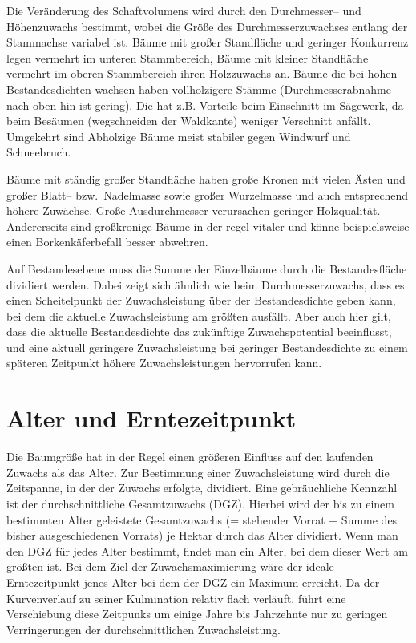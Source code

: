 \documentclass[twocolumn]{scrartcl}
\begin{document}
Die Veränderung des Schaftvolumens wird durch den Durchmesser-- und Höhenzuwachs
bestimmt, wobei die Größe des Durchmesserzuwachses entlang der Stammachse
variabel ist. Bäume mit großer Standfläche und geringer Konkurrenz legen
vermehrt im unteren Stammbereich, Bäume mit kleiner Standfläche vermehrt im
oberen Stammbereich ihren Holzzuwachs an. Bäume die bei hohen Bestandesdichten
wachsen haben vollholzigere Stämme (Durchmesserabnahme nach oben hin ist
gering). Die hat z.B. Vorteile beim Einschnitt im Sägewerk, da beim Besäumen
(wegschneiden der Waldkante) weniger Verschnitt anfällt. Umgekehrt sind
Abholzige Bäume meist stabiler gegen Windwurf und Schneebruch.

Bäume mit ständig großer Standfläche haben große Kronen mit vielen Ästen und
großer Blatt-- bzw.\ Nadelmasse sowie großer Wurzelmasse und auch entsprechend
höhere Zuwächse. Große Ausdurchmesser verursachen geringer Holzqualität.
Andererseits sind großkronige Bäume in der regel vitaler und könne
beispielsweise einen Borkenkäferbefall besser abwehren.

Auf Bestandesebene muss die Summe der Einzelbäume durch die Bestandesfläche
dividiert werden. Dabei zeigt sich ähnlich wie beim Durchmesserzuwachs, dass es
einen Scheitelpunkt der Zuwachsleistung über der Bestandesdichte geben kann, bei
dem die aktuelle Zuwachsleistung am größten ausfällt. Aber auch hier gilt, dass
die aktuelle Bestandesdichte das zukünftige Zuwachspotential beeinflusst, und
eine aktuell geringere Zuwachsleistung bei geringer Bestandesdichte zu einem
späteren Zeitpunkt höhere Zuwachsleistungen hervorrufen kann.

\section{Alter und Erntezeitpunkt}
\label{sec:AlterUndErntezeitpunkt}

Die Baumgröße hat in der Regel einen größeren Einfluss auf den laufenden Zuwachs
als das Alter. Zur Bestimmung einer Zuwachsleistung wird durch die Zeitspanne,
in der der Zuwachs erfolgte, dividiert. Eine gebräuchliche Kennzahl ist der
durchschnittliche Gesamtzuwachs (DGZ). Hierbei wird der bis zu einem bestimmten
Alter geleistete Gesamtzuwachs (= stehender Vorrat + Summe des bisher
ausgeschiedenen Vorrats) je Hektar durch das Alter dividiert. Wenn man den DGZ
für jedes Alter bestimmt, findet man ein Alter, bei dem dieser Wert am größten
ist. Bei dem Ziel der Zuwachsmaximierung wäre der ideale Erntezeitpunkt jenes
Alter bei dem der DGZ ein Maximum erreicht. Da der Kurvenverlauf zu seiner
Kulmination relativ flach verläuft, führt eine Verschiebung diese Zeitpunks um
einige Jahre bis Jahrzehnte nur zu geringen Verringerungen der
durchschnittlichen Zuwachsleistung.
\end{document}
